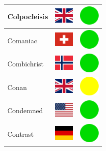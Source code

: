 \documentclass[12pt, a4paper, twoside]{report}
\begin{document}
\begin{center}
\begin{longtable}{|p{5cm}|p{2cm}|p{2cm}|}
Colpocleisis & \includegraphics[width=1cm]{4x3/gb} & \includegraphics[width=1cm]{likes/y} \\ \hline
Comaniac & \includegraphics[width=1cm]{4x3/ch} & \includegraphics[width=1cm]{likes/y} \\ \hline
Combichrist & \includegraphics[width=1cm]{4x3/no} & \includegraphics[width=1cm]{likes/y} \\ \hline
Conan & \includegraphics[width=1cm]{4x3/gb} & \includegraphics[width=1cm]{likes/m} \\ \hline
Condemned & \includegraphics[width=1cm]{4x3/us} & \includegraphics[width=1cm]{likes/y} \\ \hline
Contrast & \includegraphics[width=1cm]{4x3/de} & \includegraphics[width=1cm]{likes/y} \\ \hline

\end{longtable}
\end{center}
\end{document}
